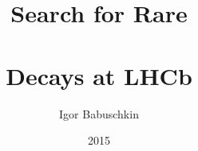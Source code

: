 \documentclass[
  BCOR=12mm,
  parskip=half,
  open=any,
]{tudothesis}
\author{Igor Babuschkin}
\title{Search for Rare\\ \bolddecay{}\\ Decays at LHCb}
\date{2015}
\begin{document}
\frontmatter
\maketitle

\makecorrectorpage


\tableofcontents

\mainmatter


\appendix


\backmatter
\printbibliography

\cleardoublepage

\end{document}
